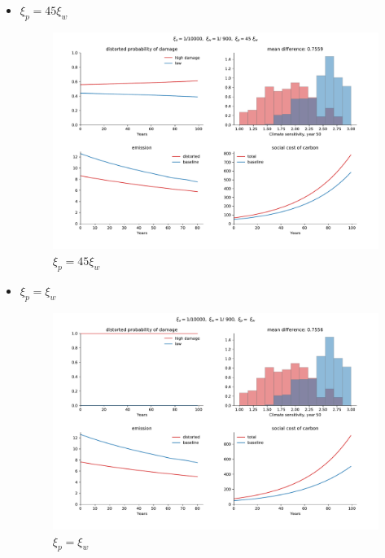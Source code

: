 \documentclass{article}
\begin{document}
\begin{itemize}
\begin{figure}[H]
            \label{fig:notebook/10_900_90}
        \end{figure}
        \newpage
    \item \(\xi_p=45\xi_w\)
        \begin{figure}[H]
            \centering
            \includegraphics[width=\linewidth]{notebook/10_900_45.pdf}
            \caption{\(\xi_p=45\xi_w\)}
            \label{fig:notebook/10_900_45}
        \end{figure}
        \newpage
    \item \(\xi_p=\xi_w\)
        \begin{figure}[H]
            \centering
            \includegraphics[width=\linewidth]{notebook/10_900_1.pdf}
            \caption{\(\xi_p=\xi_w\)}
            \label{fig:notebook/10_900_45}
        \end{figure}
\end{itemize}
\end{document}
